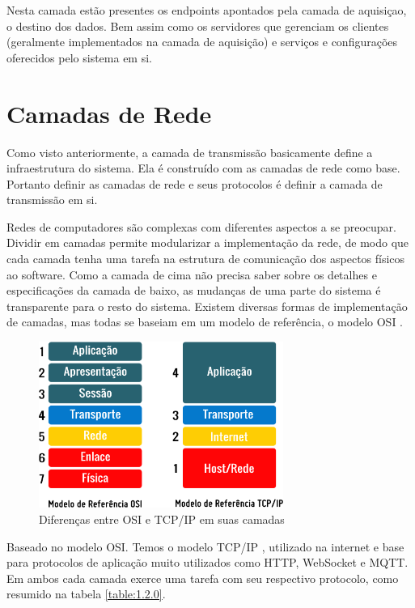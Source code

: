 Nesta camada estão presentes os endpoints apontados pela camada de aquisiçao, o destino dos dados. Bem assim como os servidores que gerenciam os clientes (geralmente implementados na camada de aquisição) e serviços e configurações oferecidos pelo sistema em si.

\section{Camadas de Rede}
\label{section:camadas_de_rede}

Como visto anteriormente, a camada de transmissão basicamente define a infraestrutura do sistema. Ela é construído com as camadas de rede como base. Portanto definir as camadas de rede e seus protocolos é definir a camada de transmissão em si.

Redes de computadores são complexas com diferentes aspectos a se preocupar. Dividir em camadas permite modularizar a implementação da rede, de modo que cada camada tenha uma tarefa na estrutura de comunicação dos aspectos físicos ao software. Como a camada de cima não precisa saber sobre os detalhes e especificações da camada de baixo, as mudanças de uma parte do sistema é transparente para o resto do sistema. Existem diversas formas de implementação de camadas, mas todas se baseiam em um modelo de referência, o modelo OSI \cite{Zimmermann:1988:ORM:59309.59310}.


\begin{figure}[h!]
\label{fig:1.2.0/modelo_osi_tcpip}
\centering
\includegraphics[width=8cm]{./02_Capitulos/02_Cap1/figures/modelo_osi_tcpip}
\caption{Diferenças entre OSI e TCP/IP em suas camadas}
\end{figure}

Baseado no modelo OSI. Temos o modelo TCP/IP \cite{TCPIP}, utilizado na internet e base para protocolos de aplicação muito utilizados como HTTP, WebSocket e MQTT. Em ambos cada camada exerce uma tarefa com seu respectivo protocolo, como resumido na tabela \ref{table:1.2.0}.

